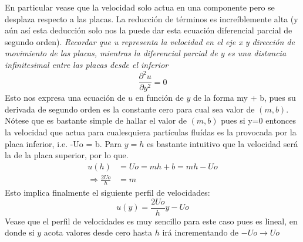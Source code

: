 \documentclass{article}
\begin{document}
En particular vease que la velocidad solo actua en una componente pero se desplaza respecto a las placas. La reducción de términos es increíblemente alta (y aún así esta deducción solo nos la puede dar esta ecuación diferencial parcial de segundo orden). \textit{Recordar que u representa la velocidad en el eje x y dirección de movimiento de las placas, mientras la diferencial parcial de $y$ es una distancia infinitesimal entre las placas desde el inferior}
\begin{equation}
    \frac{\partial^2 u}{\partial y^2} = 0
\end{equation}
Esto nos expresa una ecuación de $u$ en función de $y$ de la forma my + b, pues su derivada de segundo orden es la constante cero para cual sea valor de $(m,b)$. Nótese que es bastante simple de hallar el valor de $(m,b)$ pues si y=0 entonces la velocidad que actua para cualesquiera partículas fluídas es la provocada por la placa inferior, i.e. -Uo = b. Para $y=h$ es bastante intuitivo que la velocidad será la de la placa superior, por lo que.
\begin{align*}
u(h) &= Uo = mh + b = mh - Uo \\
\Rightarrow \frac{2Uo}{h} &= m
\end{align*}
Esto implica finalmente el siguiente perfil de velocidades:
\begin{equation*}
    u(y) = \frac{2Uo}{h}y - Uo
\end{equation*}
Vease que el perfil de velocidades es muy sencillo para este caso pues es lineal, en donde si $y$ acota valores desde cero hasta $h$ irá incrementando de $-Uo \rightarrow Uo$
\end{document}
